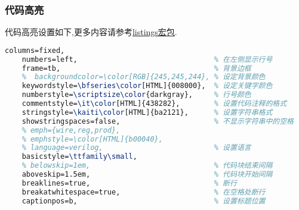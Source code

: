 \documentclass[list,answers,csize4,custom]{sysuexam}
\begin{document}
\subsubsection{代码高亮}
代码高亮设置如下,更多内容请参考\href{http://texdoc.net/texmf-dist/doc/latex/listings/listings.pdf}{listings宏包}.
\begin{lstlisting}[title=代码高亮设置,language=tex,firstnumber=212]
    columns=fixed,
    numbers=left,                                % 在左侧显示行号
    frame=tb,                                    % 背景边框
    %  backgroundcolor=\color[RGB]{245,245,244}, % 设定背景颜色
    keywordstyle=\bfseries\color[HTML]{008000},  % 设定关键字颜色
    numberstyle=\scriptsize\color{darkgray},     % 行号颜色
    commentstyle=\it\color[HTML]{438282},        % 设置代码注释的格式
    stringstyle=\kaiti\color[HTML]{ba2121},      % 设置字符串格式
    showstringspaces=false,                      % 不显示字符串中的空格
    % emph={wire,reg,prod},
    % emphstyle=\color[HTML]{b00040},
    % language=verilog,                          % 设置语言
    basicstyle=\ttfamily\small,
    % belowskip=1em,                             % 代码块结束间隔 
    aboveskip=1.5em,                             % 代码块开始间隔 
    breaklines=true,                             % 断行
    breakatwhitespace=true,                      % 在空格处断行
    captionpos=b,                                % 设置标题位置
\end{lstlisting}
\end{document}
